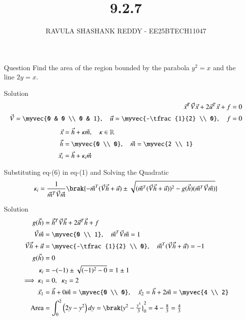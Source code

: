 \documentclass{beamer}
\title %
{9.2.7}
\author %
{RAVULA SHASHANK REDDY - EE25BTECH11047}
\begin{document}
	
	
	\frame{\titlepage}
	\begin{frame}{Question}
    Find the area of the region bounded by the parabola $y^2 = x$ and the line $2y = x$.
\end{frame}
\begin{frame}{Solution}
    \begin{align}
\vec{x}^T \vec{V} \vec{x} + 2\vec{u}^T\vec{x} + f = 0 \\
\vec{V} = \myvec{0 & 0 \\ 0 & 1},\quad 
\vec{u} = \myvec{-\tfrac{1}{2} \\ 0},\quad f=0 \\
\end{align}
\begin{align}
\vec{x} &= \vec{h} + \kappa \vec{m}, \quad \kappa \in \mathbb{R} \\
\vec{h} &= \myvec{0 \\ 0}, \quad 
\vec{m} = \myvec{2 \\ 1} \\
\vec{x}_i &= \vec{h} + \kappa_i \vec{m} 
\end{align}

Substituting eq-(6) in eq-(1) and Solving the Quadratic 
\begin{align}
\kappa_i = \frac{1}{\vec{m}^T \vec{V} \vec{m}}
\brak{-\vec{m}^T(\vec{V}\vec{h}+\vec{u})
\pm \sqrt{(\vec{m}^T(\vec{V}\vec{h}+\vec{u}))^2 - g(\vec{h})(\vec{m}^T \vec{V} \vec{m})}} 
\end{align}
\end{frame}
\begin{frame}{Solution}
\begin{align}
g(\vec{h}) &= \vec{h}^T \vec{V} \vec{h} + 2\vec{u}^T \vec{h} + f\\
\vec{V}\vec{m} &= \myvec{0 \\ 1},\quad 
\vec{m}^T \vec{V} \vec{m} = 1 \\
\vec{V}\vec{h}+\vec{u} &= \myvec{-\tfrac{1}{2} \\ 0},\quad
\vec{m}^T(\vec{V}\vec{h}+\vec{u}) = -1 \\
g(\vec{h}) &= 0\\
\kappa_i &= -(-1) \pm \sqrt{(-1)^2 - 0} 
= 1 \pm 1 \\
\implies \kappa_1 &= 0,\;\; \kappa_2 = 2\\
\vec{x}_1 &= \vec{h} + 0\vec{m} = \myvec{0 \\ 0},\quad
\vec{x}_2 = \vec{h} + 2\vec{m} = \myvec{4 \\ 2} \\
\text{Area} &= \int_{0}^{2} \Big(2y - y^2\Big)\,dy 
= \brak{y^2 - \tfrac{y^3}{3}}_0^2 
= 4 - \tfrac{8}{3} 
= \tfrac{4}{3}
\end{align}
\end{frame}
\end{document}
